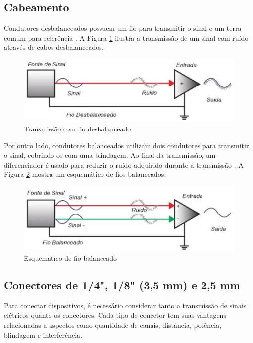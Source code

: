 \subsection{Cabeamento}

Condutores desbalanceados possuem um fio para transmitir o sinal e um terra comum para referência \cite{bartlett}. A Figura \ref{fig12} ilustra a transmissão de um sinal com ruído através de cabos desbalanceados.

\begin{figure}[h]
	\centering
    \includegraphics[scale=0.4]{figuras/fig11.eps}
	\caption{Transmissão com fio desbalanceado \cite{proaudiospQualDiferena}}
	\label{fig12}
\end{figure}

Por outro lado, condutores balanceados utilizam dois condutores para transmitir o sinal, cobrindo-os com uma blindagem. Ao final da transmissão, um diferenciador é usado para reduzir o ruído adquirido durante a transmissão \cite{bartlett}. A Figura \ref{fig11} mostra um esquemático de fios balanceados.

\begin{figure}[h]
	\centering
    \includegraphics[scale=0.4]{figuras/fig12.eps}
	\caption{Esquemático de fio balanceado \cite{proaudiospQualDiferena}}
	\label{fig11}
\end{figure}

\subsection{Conectores de 1/4", 1/8" (3,5 mm) e 2,5 mm}

Para conectar dispositivos, é necessário considerar tanto a transmissão de sinais elétricos quanto os conectores. Cada tipo de conector tem suas vantagens relacionadas a aspectos como quantidade de canais, distância, potência, blindagem e interferência.


